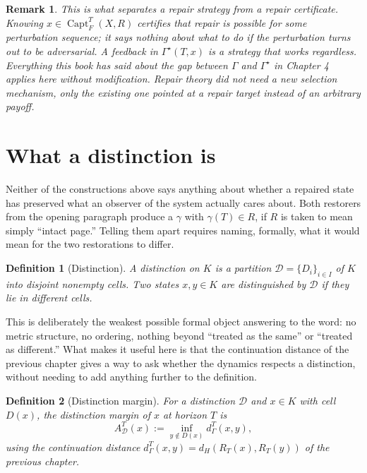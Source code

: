 \documentclass[11pt]{report}
\newtheorem{definition}{Definition}[chapter]
\newtheorem{remark}{Remark}[chapter]
\begin{document}
\begin{remark}
This is what separates a repair strategy from a repair certificate.
Knowing $x \in \operatorname{Capt}_F^T(X,R)$ certifies that repair is
possible for \emph{some} perturbation sequence; it says nothing about
what to do if the perturbation turns out to be adversarial. A feedback
in $\Gamma^\star(T,x)$ is a strategy that works regardless. Everything
this book has said about the gap between $\Gamma$ and $\Gamma^\star$ in
Chapter 4 applies here without modification. Repair theory did not
need a new selection mechanism, only the existing one pointed at a
repair target instead of an arbitrary payoff.
\end{remark}

\section*{What a distinction is}

Neither of the constructions above says anything about whether a
repaired state has preserved what an observer of the system actually
cares about. Both restorers from the opening paragraph produce a
$\gamma$ with $\gamma(T) \in R$, if $R$ is taken to mean simply
``intact page.'' Telling them apart requires naming, formally, what
it would mean for the two restorations to differ.

\begin{definition}[Distinction]
A distinction on $K$ is a partition $\mathcal{D} = \{D_i\}_{i \in I}$
of $K$ into disjoint nonempty cells. Two states $x, y \in K$ are
distinguished by $\mathcal{D}$ if they lie in different cells.
\end{definition}

This is deliberately the weakest possible formal object answering to
the word: no metric structure, no ordering, nothing beyond ``treated as
the same'' or ``treated as different.'' What makes it useful here is
that the continuation distance of the previous chapter gives a way to
ask whether the dynamics respects a distinction, without needing to add
anything further to the definition.

\begin{definition}[Distinction margin]
For a distinction $\mathcal{D}$ and $x \in K$ with cell $D(x)$, the
distinction margin of $x$ at horizon $T$ is
\[
A_{\mathcal{D}}^T(x) := \inf_{y \notin D(x)} d_\Gamma^T(x,y),
\]
using the continuation distance $d_\Gamma^T(x,y) = d_H(R_T(x), R_T(y))$
of the previous chapter.
\end{definition}
\end{document}
